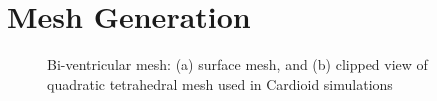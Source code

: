 \chapter{Mesh Generation}
%

\begin{figure}[ht]
\centering
{}
%
\caption{Bi-ventricular mesh: (a) surface mesh, and (b) clipped view of quadratic tetrahedral mesh used in Cardioid simulations}
\label{fig:tetmesh}
\end{figure}

